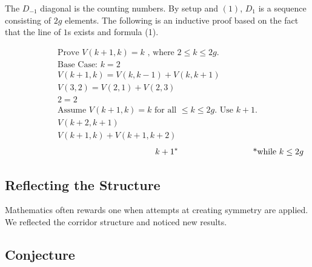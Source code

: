 \documentclass{article}
\newcommand\tab[1][1cm]{\hspace*{#1}}
\theoremstyle{definition}
\begin{document}
    \noindent The $D_{-1}$ diagonal is the counting numbers.
 By setup and $(1)$, $D_{1}$ is a sequence consisting of $2g$ elements.
 The following is an inductive proof based on the fact that the line of $1$s exists and formula (1).

\begin{gather*}
  \text{Prove   } V(k+1, k) = k\text{ , where } 2 \leq k \leq 2g\text{.} \\
  \text{Base Case: }k = 2\\
  V(k+1,k) = V(k,k-1) + V(k,k+1)\\
  V(3,2) = V(2,1) + V(2,3)\\
  2 = 2\\
  \text{Assume } V(k+1, k) = k \text{ for all } \leq k \leq 2g \text{. }
  \text{Use } k+1 \text{.}\\
  V(k+2,k+1)\\
  V(k+1,k) + V(k+1, k+2)
\end{gather*}
\begin{align}
  \tab\tab\tab\tab\tab\tab k + 1^* \tab\tab\tab \text{ *while } k \leq 2g
 \end{align}
   
  \subsection*{Reflecting the Structure}
  \tab Mathematics often rewards one when attempts at creating symmetry are applied. We reflected the corridor structure 
  and noticed new results. 
  
  
  
  \subsection*{Conjecture}
  
\end{document}
